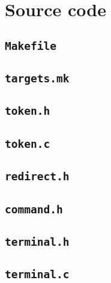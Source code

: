 \section{Source code}
\label{sec:source}

\subsection{\texttt{Makefile}}


\subsection{\texttt{targets.mk}}


\subsection{\texttt{token.h}}


\subsection{\texttt{token.c}}


\subsection{\texttt{redirect.h}}


\subsection{\texttt{command.h}}


\subsection{\texttt{terminal.h}}


\subsection{\texttt{terminal.c}}


